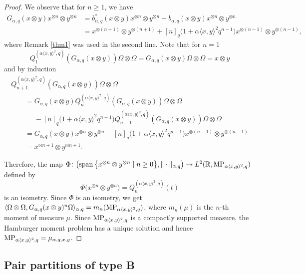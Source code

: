 \documentclass[pdftex]{sigma}
\numberwithin{equation}{section}
\def\R{{\mathbb R}}
\def\B{b_{\s,\q}}
\def\G{G_{\s,\q}}
\def\m{\mu_{\s,\q,x,y}}
\def\qMP{{\rm MP}}
\newcommand{\q}{q}
\newcommand{\s}{\alpha}%
\begin{document}
\begin{proof}
	We observe that for $n \geq 1$, we have
	\begin{align*}
		\G(x\otimes y )x^{\otimes n}\otimes y^{\otimes n}
		&= \B^\ast(x\otimes y )x^{\otimes n}\otimes y^{\otimes n} +\B(x\otimes y) x^{\otimes n}\otimes y^{\otimes n}
\\
		&= x^{\otimes (n+1)}\otimes y^{\otimes (n+1)}+[n]_\q \big(1 + \s\langle x,y\rangle^2 \q^{n-1}\big)x^{\otimes (n-1)}\otimes y^{\otimes (n-1)},
	\end{align*}
	where Remark \ref{thm1} was used in the second line.
	Note that for $n=1$
\[
Q_{1}^{(\s\langle x,y\rangle^2,\q)}(\G(x\otimes y ))\Omega\otimes \Omega =\G(x\otimes y )\Omega \otimes \Omega =x\otimes y
\]
and by induction
\begin{gather*}
Q_{n+1}^{(\s\langle x,y\rangle^2,\q)}(\G(x\otimes y ))\Omega \otimes \Omega
\\ \qquad
{}=\G(x\otimes y ) Q_n^{(\s\langle x,y\rangle^2,\q)}( \G(x\otimes y ))\Omega\otimes \Omega
\\ \qquad\phantom{=}
{}-[n]_q \big(1 + \s\langle x, y\rangle^2 q^{n-1}\big)Q_{n-1}^{(\s\langle x,y\rangle^2,\q)}( \G(x\otimes y ))\Omega\otimes \Omega
\\ \qquad
{}=\G(x\otimes y ) x^{\otimes n}\otimes y^{\otimes n} - [n]_q\big(1+ \s\langle x, y\rangle^2 q^{n-1}\big)x^{\otimes (n-1)}\otimes y^{\otimes (n-1)}
\\ \qquad
{}=x^{\otimes n+1}\otimes y^{\otimes n+1}.
	\end{gather*}
	
Therefore, the map $\Phi\colon \bigl(\operatorname{span}\big\{x^{\otimes n}\otimes y^{\otimes n}\mid n \geq 0\big\}, \|\cdot\|_{\s,\q}\bigr) \to L^2(\R,\qMP_{\s\langle x,y\rangle^2 ,\q})$ defined by
\[
\Phi\big(x^{\otimes n}\otimes y^{\otimes n}\big)= Q_n^{(\s\langle x,y\rangle^2,\q)}(t)
\]
is an isometry.
	Since $\Phi$ is an isometry, we get
	$\langle \Omega \otimes \Omega, \G(x\otimes y)^n\Omega\rangle_{\s,\q} = m_n(\qMP_{\s\langle x,y\rangle^2,\q})$, where $m_n(\mu)$ is the $n$-th moment of measure $\mu$.
	Since $\qMP_{\s\langle x,y\rangle^2,\q}$ is a compactly supported measure, the Hamburger moment problem has a unique solution and hence $\qMP_{\s\langle x,y\rangle^2,\q}=\m$.
\end{proof}




\subsection{Pair partitions of type B}
\end{document}
